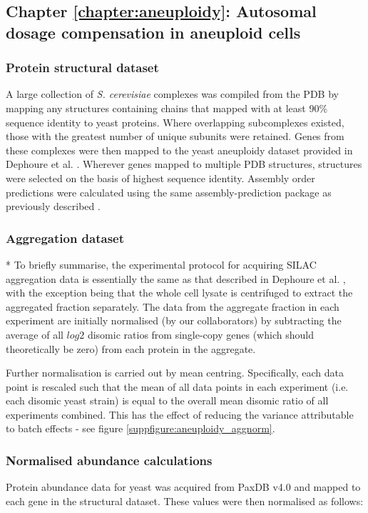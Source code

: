 \documentclass[a4paper,11pt,twoside,openright]{scrbook}
\begin{document}
\subsection{Chapter \ref*{chapter:aneuploidy}: Autosomal dosage compensation in aneuploid cells}
\subsubsection{Protein structural dataset}
A large collection of \textit{S. cerevisiae} complexes was compiled from the PDB by mapping any structures containing chains that mapped with at least 90\% sequence identity to yeast proteins. Where overlapping subcomplexes existed, those with the greatest number of unique subunits were retained. Genes from these complexes were then mapped to the yeast aneuploidy dataset provided in Dephoure et al. \cite{Dephoure2014}. Wherever genes mapped to multiple PDB structures, structures were selected on the basis of highest sequence identity. Assembly order predictions were calculated using the same assembly-prediction package as previously described \cite{Wells2016}.


\subsubsection{Aggregation dataset}
* To briefly summarise, the experimental protocol for acquiring SILAC aggregation data is essentially the same as that described in Dephoure et al. \cite{Dephoure2014}, with the exception being that the whole cell lysate is centrifuged to extract the aggregated fraction separately. The data from the aggregate fraction in each experiment are initially normalised (by our collaborators) by subtracting the average of all $log{2}$ disomic ratios from single-copy genes (which should theoretically be zero) from each protein in the aggregate.

Further normalisation is carried out by mean centring. Specifically, each data point is rescaled such that the mean of all data points in each experiment (i.e. each disomic yeast strain) is equal to the overall mean disomic ratio of all experiments combined. This has the effect of reducing the variance attributable to batch effects - see figure \ref{suppfigure:aneuploidy_aggnorm}.

\subsubsection{Normalised abundance calculations}
Protein abundance data for yeast was acquired from PaxDB v4.0 \cite{Wang2015} and mapped to each gene in the structural dataset. These values were then normalised as follows:
\end{document}
